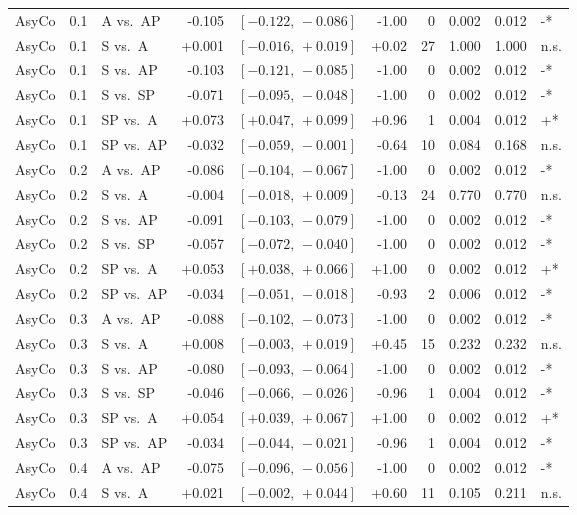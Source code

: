 \begin{landscape}
\begin{scriptsize}
\begin{longtable}{lllrrrrrrl}
AsyCo & 0.1 & A vs.\ AP & -0.105 & $[-0.122,\,-0.086]$ & -1.00 & 0 & 0.002 & 0.012 & -* \\
AsyCo & 0.1 & S vs.\ A & +0.001 & $[-0.016,\,+0.019]$ & +0.02 & 27 & 1.000 & 1.000 & n.s. \\
AsyCo & 0.1 & S vs.\ AP & -0.103 & $[-0.121,\,-0.085]$ & -1.00 & 0 & 0.002 & 0.012 & -* \\
AsyCo & 0.1 & S vs.\ SP & -0.071 & $[-0.095,\,-0.048]$ & -1.00 & 0 & 0.002 & 0.012 & -* \\
AsyCo & 0.1 & SP vs.\ A & +0.073 & $[+0.047,\,+0.099]$ & +0.96 & 1 & 0.004 & 0.012 & +* \\
AsyCo & 0.1 & SP vs.\ AP & -0.032 & $[-0.059,\,-0.001]$ & -0.64 & 10 & 0.084 & 0.168 & n.s. \\
AsyCo & 0.2 & A vs.\ AP & -0.086 & $[-0.104,\,-0.067]$ & -1.00 & 0 & 0.002 & 0.012 & -* \\
AsyCo & 0.2 & S vs.\ A & -0.004 & $[-0.018,\,+0.009]$ & -0.13 & 24 & 0.770 & 0.770 & n.s. \\
AsyCo & 0.2 & S vs.\ AP & -0.091 & $[-0.103,\,-0.079]$ & -1.00 & 0 & 0.002 & 0.012 & -* \\
AsyCo & 0.2 & S vs.\ SP & -0.057 & $[-0.072,\,-0.040]$ & -1.00 & 0 & 0.002 & 0.012 & -* \\
AsyCo & 0.2 & SP vs.\ A & +0.053 & $[+0.038,\,+0.066]$ & +1.00 & 0 & 0.002 & 0.012 & +* \\
AsyCo & 0.2 & SP vs.\ AP & -0.034 & $[-0.051,\,-0.018]$ & -0.93 & 2 & 0.006 & 0.012 & -* \\
AsyCo & 0.3 & A vs.\ AP & -0.088 & $[-0.102,\,-0.073]$ & -1.00 & 0 & 0.002 & 0.012 & -* \\
AsyCo & 0.3 & S vs.\ A & +0.008 & $[-0.003,\,+0.019]$ & +0.45 & 15 & 0.232 & 0.232 & n.s. \\
AsyCo & 0.3 & S vs.\ AP & -0.080 & $[-0.093,\,-0.064]$ & -1.00 & 0 & 0.002 & 0.012 & -* \\
AsyCo & 0.3 & S vs.\ SP & -0.046 & $[-0.066,\,-0.026]$ & -0.96 & 1 & 0.004 & 0.012 & -* \\
AsyCo & 0.3 & SP vs.\ A & +0.054 & $[+0.039,\,+0.067]$ & +1.00 & 0 & 0.002 & 0.012 & +* \\
AsyCo & 0.3 & SP vs.\ AP & -0.034 & $[-0.044,\,-0.021]$ & -0.96 & 1 & 0.004 & 0.012 & -* \\
AsyCo & 0.4 & A vs.\ AP & -0.075 & $[-0.096,\,-0.056]$ & -1.00 & 0 & 0.002 & 0.012 & -* \\
AsyCo & 0.4 & S vs.\ A & +0.021 & $[-0.002,\,+0.044]$ & +0.60 & 11 & 0.105 & 0.211 & n.s. \\

\end{longtable}
\end{scriptsize}
\end{landscape}
